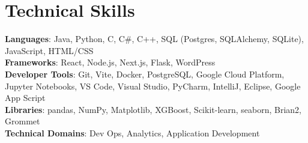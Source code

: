 \documentclass[letterpaper,11pt]{article}
\begin{document}
\section{Technical Skills}
 \begin{itemize}[leftmargin=0.15in, label={}]
    \small{\item{
     \textbf{Languages}{: Java, Python, C, C\#, C++, SQL (Postgres, SQLAlchemy, SQLite), JavaScript, HTML/CSS} \\
     \textbf{Frameworks}{: React, Node.js, Next.js, Flask, WordPress} \\
     \textbf{Developer Tools}{: Git, Vite, Docker, PostgreSQL, Google Cloud Platform, Jupyter Notebooks, VS Code, Visual Studio, PyCharm, IntelliJ, Eclipse, Google App Script} \\
     \textbf{Libraries}{: pandas, NumPy, Matplotlib, XGBoost, Scikit-learn, seaborn, Brian2, Grommet} \\
     \textbf{Technical Domains}{: Dev Ops, Analytics, Application Development} 
    }}
 \end{itemize}


\end{document}
